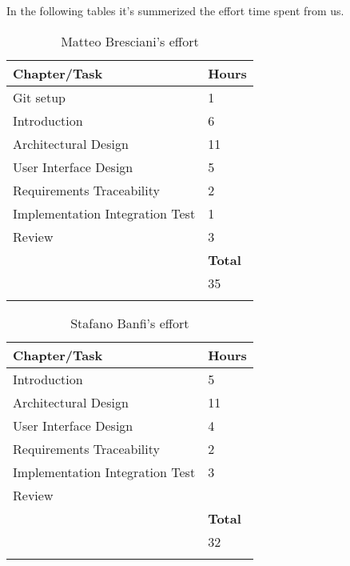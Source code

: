 In the following tables it's summerized the effort time spent from us. 

	\begin{longtable}{| p{5 cm} | p{1 cm} |} 
			\hline
			{\bf Chapter/Task} & {\bf Hours}\\
			\hline
            Git setup & 1 \\
			Introduction & 6 \\
			Architectural Design & 11 \\
			User Interface Design & 5\\
			Requirements Traceability & 2 \\
			Implementation Integration Test & 1 \\
            Review & 3 \\
			\hline
			&  {\bf Total} \\
			\hline
			&  35 \\
			\hline
			\caption{Matteo Bresciani's effort}
		\end{longtable}

			\begin{longtable}{| p{5 cm} | p{1 cm} |} 
			\hline
			{\bf Chapter/Task} & {\bf Hours}\\
			\hline
			Introduction & 5 \\
			Architectural Design & 11 \\
			User Interface Design & 4 \\
			Requirements Traceability & 2 \\
			Implementation Integration Test & 3 \\
            Review & \\
			\hline
			&  {\bf Total} \\
			\hline
			&  32 \\
			\hline
			\caption{Stafano Banfi's effort}
		\end{longtable}
	